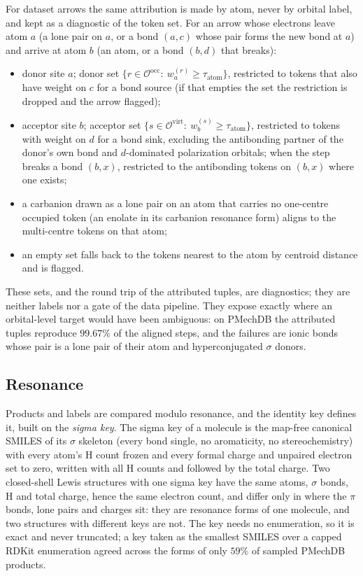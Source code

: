 \documentclass[11pt,a4paper]{article}
\newcommand{\occ}{\mathrm{occ}}
\newcommand{\virt}{\mathrm{virt}}
\newcommand{\set}[1]{\{#1\}}
\begin{document}
For dataset arrows the same attribution is made by atom, never by orbital label, and kept as a diagnostic of the token set. For an arrow whose electrons leave atom $a$ (a lone pair on $a$, or a bond $(a,c)$ whose pair forms the new bond at $a$) and arrive at atom $b$ (an atom, or a bond $(b,d)$ that breaks):
\begin{itemize}[nosep]
\item donor site $a$; donor set $\set{r\in\mathcal{O}^{\occ}:\ w^{(r)}_a\ge\tau_{\mathrm{atom}}}$, restricted to tokens that also have weight on $c$ for a bond source (if that empties the set the restriction is dropped and the arrow flagged);
\item acceptor site $b$; acceptor set $\set{s\in\mathcal{O}^{\virt}:\ w^{(s)}_b\ge\tau_{\mathrm{atom}}}$, restricted to tokens with weight on $d$ for a bond sink, excluding the antibonding partner of the donor's own bond and $d$-dominated polarization orbitals; when the step breaks a bond $(b,x)$, restricted to the antibonding tokens on $(b,x)$ where one exists;
\item a carbanion drawn as a lone pair on an atom that carries no one-centre occupied token (an enolate in its carbanion resonance form) aligns to the multi-centre tokens on that atom;
\item an empty set falls back to the tokens nearest to the atom by centroid distance and is flagged.
\end{itemize}
These sets, and the round trip of the attributed tuples, are diagnostics; they are neither labels nor a gate of the data pipeline. They expose exactly where an orbital-level target would have been ambiguous: on PMechDB the attributed tuples reproduce $99.67\%$ of the aligned steps, and the failures are ionic bonds whose pair is a lone pair of their atom and hyperconjugated $\sigma$ donors.

\subsection{Resonance}
\label{sec:resonance}
Products and labels are compared modulo resonance, and the identity key defines it, built on the \emph{sigma key}. The sigma key of a molecule is the map-free canonical SMILES of its $\sigma$ skeleton (every bond single, no aromaticity, no stereochemistry) with every atom's H count frozen and every formal charge and unpaired electron set to zero, written with all H counts and followed by the total charge. Two closed-shell Lewis structures with one sigma key have the same atoms, $\sigma$ bonds, H and total charge, hence the same electron count, and differ only in where the $\pi$ bonds, lone pairs and charges sit: they are resonance forms of one molecule, and two structures with different keys are not. The key needs no enumeration, so it is exact and never truncated; a key taken as the smallest SMILES over a capped RDKit enumeration agreed across the forms of only $59\%$ of sampled PMechDB products.
\end{document}
